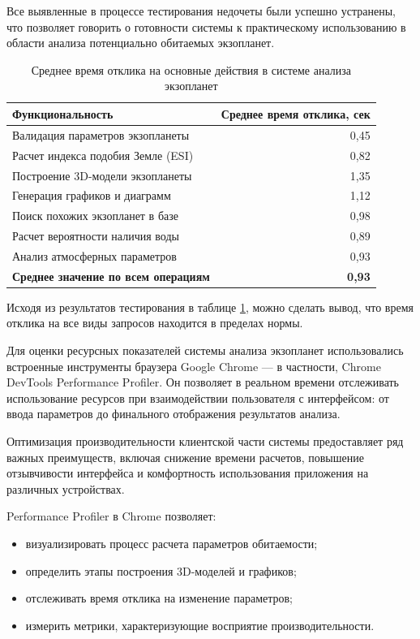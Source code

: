 Все выявленные в процессе тестирования недочеты были успешно устранены, что позволяет говорить о готовности системы к практическому использованию в области анализа потенциально обитаемых экзопланет.

\begin{table}[H]
\captionsetup{justification=raggedright,singlelinecheck=false}
\caption{Среднее время отклика на основные действия в системе анализа экзопланет}
\label{table_2}
\begin{tabular}{|p{9cm}|r|}
    \hline
    \textbf{Функциональность} & \textbf{Среднее время отклика, сек} \\
    \hline
    Валидация параметров экзопланеты & 0,45 \\
    \hline
    Расчет индекса подобия Земле (ESI) & 0,82 \\
    \hline
    Построение 3D-модели экзопланеты & 1,35 \\
    \hline
    Генерация графиков и диаграмм & 1,12 \\
    \hline
    Поиск похожих экзопланет в базе & 0,98 \\
    \hline
    Расчет вероятности наличия воды & 0,89 \\
    \hline
    Анализ атмосферных параметров & 0,93 \\
    \hline
    \textbf{Среднее значение по всем операциям} & \textbf{0,93} \\
    \hline
\end{tabular}
\end{table}

Исходя из результатов тестирования в таблице \ref{table_2}, можно сделать вывод, что время отклика на все виды запросов находится в пределах нормы.

Для оценки ресурсных показателей системы анализа экзопланет использовались встроенные инструменты браузера Google Chrome --- в частности, Chrome DevTools Performance Profiler. Он позволяет в реальном времени отслеживать использование ресурсов при взаимодействии пользователя с интерфейсом: от ввода параметров до финального отображения результатов анализа.

Оптимизация производительности клиентской части системы предоставляет ряд важных преимуществ, включая снижение времени расчетов, повышение отзывчивости интерфейса и комфортность использования приложения на различных устройствах.

Performance Profiler в Chrome позволяет:
\begin{itemize}
    \item визуализировать процесс расчета параметров обитаемости;
    \item определить этапы построения 3D-моделей и графиков;
    \item отслеживать время отклика на изменение параметров;
    \item измерить метрики, характеризующие восприятие производительности.
\end{itemize}

